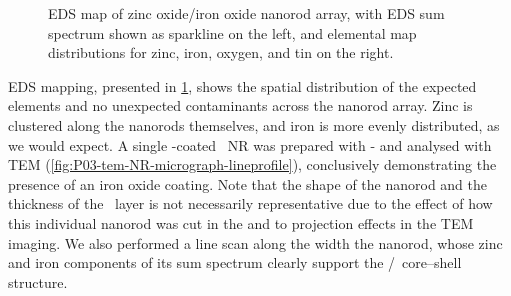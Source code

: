 \documentclass[draft,webedition,openright,titles,swedish,english]{LuaUUThesis}\usepackage[]{graphicx}\usepackage[]{xcolor}
\begin{document}
\begin{figure}[tbp]
\caption[EDS map of zinc oxide/iron oxide nanorod array]{%
   EDS map of zinc oxide/iron oxide nanorod array, with EDS sum spectrum shown
   as sparkline on the left, and elemental map distributions for zinc, iron,
   oxygen, and tin on the right.}
\label{fig:P03-eds-map}
\end{figure}

\Gls{EDS} mapping, presented in \cref{fig:P03-eds-map}, shows the spatial
distribution of the expected elements and no unexpected contaminants
across the nanorod array.
Zinc is clustered along the nanorods themselves, and iron is more evenly distributed,
as we would expect.
A single \ironox-coated \ZnO\ \gls{NR} was prepared with -
and analysed with \gls{TEM} (\cref{fig:P03-tem-NR-micrograph-lineprofile}), conclusively
demonstrating the presence of an iron oxide coating.
Note that the shape of the nanorod and the thickness of the \ironox\ layer
is not necessarily representative due to the effect of how this individual nanorod
was cut in the  and to projection effects in the \gls{TEM} imaging.
We also performed a line scan along the width the nanorod, whose zinc and iron
components of its sum spectrum clearly support the \ZnO/\ironox\ core--shell structure.



%
\end{document}
